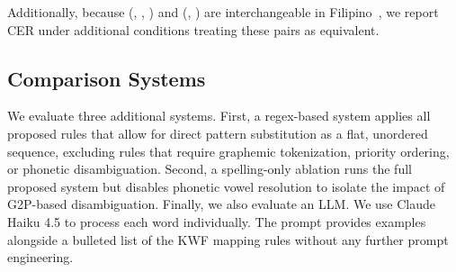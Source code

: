 Additionally, because (, , ) and (, ) are
interchangeable in Filipino~\cite{schachter1972}, we report CER under
additional conditions treating these pairs as equivalent.

\subsection{Comparison Systems}

We evaluate three additional systems. First, a regex-based system applies all
proposed rules that allow for direct pattern substitution as a flat, unordered
sequence, excluding rules that require graphemic tokenization, priority
ordering, or phonetic disambiguation. Second, a spelling-only ablation runs the
full proposed system but disables phonetic vowel resolution to isolate the
impact of G2P-based disambiguation. Finally, we also evaluate an LLM. We use
Claude Haiku 4.5 to process each word individually. The prompt provides
examples alongside a bulleted list of the KWF mapping rules without any further
prompt engineering.